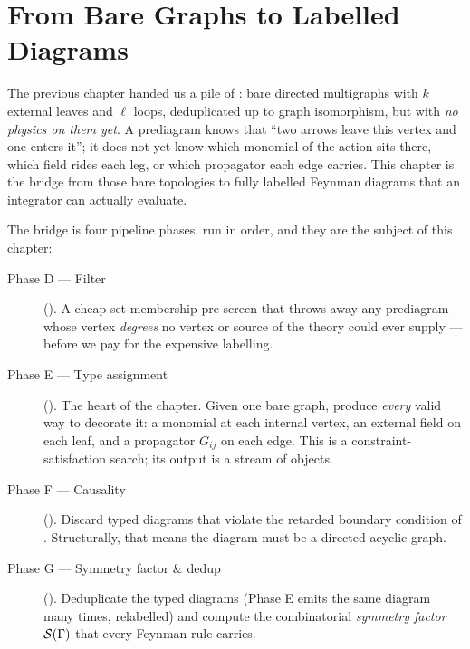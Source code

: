 \chapter{From Bare Graphs to Labelled Diagrams}\label{ch:type-assignment}

The previous chapter handed us a pile of : bare directed
multigraphs with $k$ external leaves and $\ell$ loops, deduplicated up to graph
isomorphism, but with \emph{no physics on them yet}. A prediagram knows that
``two arrows leave this vertex and one enters it''; it does not yet know which
monomial of the action sits there, which field rides each leg, or which
propagator each edge carries. This chapter is the bridge from those bare
topologies to fully labelled Feynman diagrams that an integrator can actually
evaluate.

The bridge is four pipeline phases, run in order, and they are the subject of
this chapter:

\begin{description}
  \item[Phase D --- Filter] (). A cheap
        set-membership pre-screen that throws away any prediagram whose vertex
        \emph{degrees} no vertex or source of the theory could ever supply ---
        before we pay for the expensive labelling.
  \item[Phase E --- Type assignment] ().
        The heart of the chapter. Given one bare graph, produce \emph{every}
        valid way to decorate it: a monomial at each internal vertex, an external
        field on each leaf, and a propagator $G_{ij}$ on each edge. This is a
        constraint-satisfaction search; its output is a stream of
         objects.
  \item[Phase F --- Causality] (). Discard typed
        diagrams that violate the retarded boundary condition of \msrjd{}.
        Structurally, that means the diagram must be a directed acyclic graph.
  \item[Phase G --- Symmetry factor \& dedup]
        (). Deduplicate the typed diagrams (Phase
        E emits the same diagram many times, relabelled) and compute the
        combinatorial \emph{symmetry factor} $\mathcal{S}(\Gamma)$ that every Feynman
        rule carries.
\end{description}


